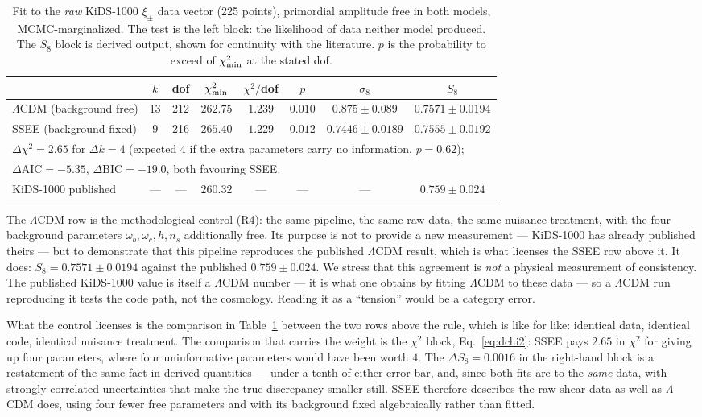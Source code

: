 \documentclass[12pt,a4paper]{article}
\newcommand{\SSEE}{\textsc{SSEE}}
\begin{document}
\begin{table}[h]
\centering
\caption{Fit to the \emph{raw} KiDS-1000 $\xi_\pm$ data vector (225 points),
primordial amplitude free in both models, MCMC-marginalized. The test is the
left block: the likelihood of data neither model produced. The $S_8$ block is
derived output, shown for continuity with the literature. $p$ is the
probability to exceed of $\chi^2_{\rm min}$ at the stated dof.}
\label{tab:s8}
\begin{tabular}{lccccccc}
\toprule
 & $k$ & dof & $\chi^2_{\rm min}$ & $\chi^2/$dof & $p$ & $\sigma_8$ & $S_8$ \\
\midrule
$\Lambda$CDM (background free)  & 13 & 212 & $262.75$ & $1.239$ & $0.010$ & $0.875\pm0.089$ & $0.7571\pm0.0194$ \\
\SSEE{} (background fixed)      &  9 & 216 & $265.40$ & $1.229$ & $0.012$ & $0.7446\pm0.0189$ & $0.7555\pm0.0192$ \\
\midrule
\multicolumn{8}{l}{\footnotesize $\Delta\chi^2=2.65$ for $\Delta k=4$ (expected $4$ if the extra parameters carry no information, $p=0.62$);} \\
\multicolumn{8}{l}{\footnotesize $\Delta\mathrm{AIC}=-5.35$, $\Delta\mathrm{BIC}=-19.0$, both favouring \SSEE{}.} \\
\midrule
KiDS-1000 published & --- & --- & $260.32$ & --- & --- & --- & $0.759\pm0.024$ \\
\bottomrule
\end{tabular}
\end{table}

The $\Lambda$CDM row is the methodological control (R4): the same pipeline,
the same raw data, the same nuisance treatment, with the four background
parameters $\omega_b,\omega_c,h,n_s$ additionally free. Its purpose is not to
provide a new measurement --- KiDS-1000 has already published theirs --- but
to demonstrate that this pipeline reproduces the published $\Lambda$CDM
result, which is what licenses the \SSEE{} row above it. It does:
$S_8=0.7571\pm0.0194$ against the published $0.759\pm0.024$. We stress that
this agreement is \emph{not} a physical measurement of consistency. The
published KiDS-1000 value is itself a $\Lambda$CDM number --- it is what one
obtains by fitting $\Lambda$CDM to these data --- so a $\Lambda$CDM run
reproducing it tests the code path, not the cosmology. Reading it as a
``tension'' would be a category error.

What the control licenses is the comparison in Table~\ref{tab:s8} between the
two rows above the rule, which is like for like: identical data, identical
code, identical nuisance treatment. The comparison that carries the weight is
the $\chi^2$ block, Eq.~\eqref{eq:dchi2}: \SSEE{} pays $2.65$ in $\chi^2$ for
giving up four parameters, where four uninformative parameters would have been
worth $4$. The $\Delta S_8 = 0.0016$ in the right-hand block is a restatement
of the same fact in derived quantities --- under a tenth of either error bar,
and, since both fits are to the \emph{same} data, with strongly correlated
uncertainties that make the true discrepancy smaller still. \SSEE{} therefore
describes the raw shear data as well as $\Lambda$CDM does, using four fewer
free parameters and with its background fixed algebraically rather than
fitted.
\end{document}

